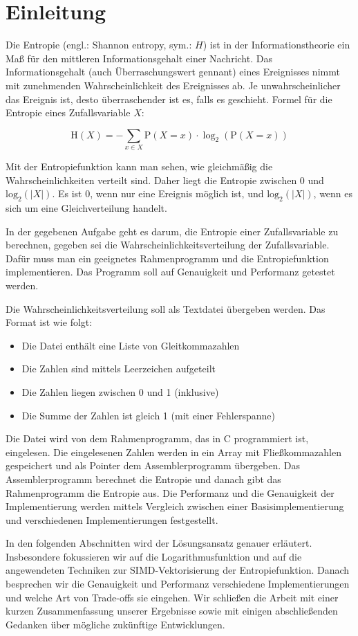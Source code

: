 \section{Einleitung}

Die Entropie (engl.: Shannon entropy, sym.: $H$) ist in der Informationstheorie ein Maß für den mittleren Informationsgehalt einer Nachricht. Das Informationsgehalt (auch Überraschungswert gennant) eines Ereignisses nimmt mit zunehmenden Wahrscheinlichkeit des Ereignisses ab. Je unwahrscheinlicher das Ereignis ist, desto überraschender ist es, falls es geschieht. Formel für die Entropie eines Zufallsvariable $X$:

\begin{equation*}
    \mathrm {H} (X)=-\sum _{x \in X}{\mathrm {P} (X = x) \cdot \log_2 (\mathrm {P} (X = x))}
\end{equation*}

Mit der Entropiefunktion kann man sehen, wie gleichmäßig die Wahrscheinlichkeiten verteilt sind. Daher liegt die Entropie zwischen 0 und $\mathrm{log_{2}}(|X|)$. Es ist 0, wenn nur eine Ereignis möglich ist, und $\mathrm{log_{2}}(|X|)$, wenn es sich um eine Gleichverteilung handelt.

In der gegebenen Aufgabe geht es darum, die Entropie einer Zufallsvariable zu berechnen, gegeben sei die Wahrscheinlichkeitsverteilung der Zufallsvariable. Dafür muss man ein geeignetes Rahmenprogramm und die Entropiefunktion implementieren. Das Programm soll auf Genauigkeit und Performanz getestet werden.

Die Wahrscheinlichkeitsverteilung soll als Textdatei übergeben werden. Das Format ist wie folgt:

\begin{itemize}
    \item Die Datei enthält eine Liste von Gleitkommazahlen
    \item Die Zahlen sind mittels Leerzeichen aufgeteilt
    \item Die Zahlen liegen zwischen 0 und 1 (inklusive)
    \item Die Summe der Zahlen ist gleich 1 (mit einer Fehlerspanne)
\end{itemize}

Die Datei wird von dem Rahmenprogramm, das in C programmiert ist, eingelesen. Die eingelesenen Zahlen werden in ein Array mit
Fließkommazahlen gespeichert und als Pointer dem Assemblerprogramm übergeben. Das Assemblerprogramm berechnet die Entropie und danach gibt das Rahmenprogramm die Entropie aus. Die Performanz und die Genauigkeit der Implementierung werden mittels Vergleich zwischen einer Basisimplementierung und verschiedenen Implementierungen festgestellt.

In den folgenden Abschnitten wird der Lösungsansatz genauer erläutert. Insbesondere fokussieren wir auf die Logarithmusfunktion und auf die angewendeten Techniken zur SIMD-Vektorisierung der Entropiefunktion. Danach besprechen wir die Genauigkeit und Performanz verschiedene Implementierungen und welche Art von Trade-offs sie eingehen. Wir schließen die Arbeit mit einer kurzen Zusammenfassung unserer Ergebnisse sowie mit einigen abschließenden Gedanken über mögliche zukünftige Entwicklungen.